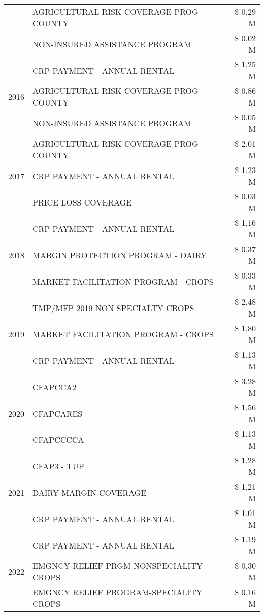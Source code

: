 \begin{tabular}{llr}
 & AGRICULTURAL RISK COVERAGE PROG - COUNTY & \$ 0.29 M \\
 & NON-INSURED ASSISTANCE PROGRAM & \$ 0.02 M \\
\cline{1-3}
\multirow[t]{3}{*}{2016} & CRP PAYMENT - ANNUAL RENTAL & \$ 1.25 M \\
 & AGRICULTURAL RISK COVERAGE PROG - COUNTY & \$ 0.86 M \\
 & NON-INSURED ASSISTANCE PROGRAM & \$ 0.05 M \\
\cline{1-3}
\multirow[t]{3}{*}{2017} & AGRICULTURAL RISK COVERAGE PROG - COUNTY & \$ 2.01 M \\
 & CRP PAYMENT - ANNUAL RENTAL & \$ 1.23 M \\
 & PRICE LOSS COVERAGE & \$ 0.03 M \\
\cline{1-3}
\multirow[t]{3}{*}{2018} & CRP PAYMENT - ANNUAL RENTAL & \$ 1.16 M \\
 & MARGIN PROTECTION PROGRAM - DAIRY & \$ 0.37 M \\
 & MARKET FACILITATION PROGRAM - CROPS & \$ 0.33 M \\
\cline{1-3}
\multirow[t]{3}{*}{2019} & TMP/MFP 2019 NON SPECIALTY CROPS & \$ 2.48 M \\
 & MARKET FACILITATION PROGRAM - CROPS & \$ 1.80 M \\
 & CRP PAYMENT - ANNUAL RENTAL & \$ 1.13 M \\
\cline{1-3}
\multirow[t]{3}{*}{2020} & CFAPCCA2 & \$ 3.28 M \\
 & CFAPCARES & \$ 1.56 M \\
 & CFAPCCCCA & \$ 1.13 M \\
\cline{1-3}
\multirow[t]{3}{*}{2021} & CFAP3 - TUP & \$ 1.28 M \\
 & DAIRY MARGIN COVERAGE & \$ 1.21 M \\
 & CRP PAYMENT - ANNUAL RENTAL & \$ 1.01 M \\
\cline{1-3}
\multirow[t]{3}{*}{2022} & CRP PAYMENT - ANNUAL RENTAL & \$ 1.19 M \\
 & EMGNCY RELIEF PRGM-NONSPECIALITY CROPS & \$ 0.30 M \\
 & EMGNCY RELIEF PROGRAM-SPECIALITY CROPS & \$ 0.16 M \\
\cline{1-3}
\bottomrule
\end{tabular}

